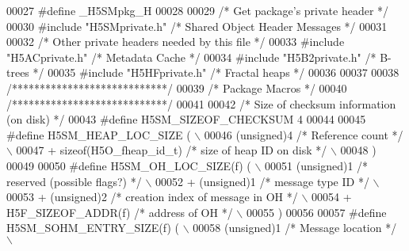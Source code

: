 \begin{DoxyCode}
00027 \textcolor{preprocessor}{#define \_H5SMpkg\_H}
00028 
00029 \textcolor{comment}{/* Get package's private header */}
00030 \textcolor{preprocessor}{#include "H5SMprivate.h"}    \textcolor{comment}{/* Shared Object Header Messages    */}
00031 
00032 \textcolor{comment}{/* Other private headers needed by this file */}
00033 \textcolor{preprocessor}{#include "H5ACprivate.h"}        \textcolor{comment}{/* Metadata Cache           */}
00034 \textcolor{preprocessor}{#include "H5B2private.h"}        \textcolor{comment}{/* B-trees                              */}
00035 \textcolor{preprocessor}{#include "H5HFprivate.h"}        \textcolor{comment}{/* Fractal heaps            */}
00036 
00037 
00038 \textcolor{comment}{/****************************/}
00039 \textcolor{comment}{/* Package Macros           */}
00040 \textcolor{comment}{/****************************/}
00041 
00042 \textcolor{comment}{/* Size of checksum information (on disk) */}
00043 \textcolor{preprocessor}{#define H5SM\_SIZEOF\_CHECKSUM 4}
00044 
00045 \textcolor{preprocessor}{#define H5SM\_HEAP\_LOC\_SIZE (                                                  \(\backslash\)}
00046 \textcolor{preprocessor}{        (unsigned)4                     }\textcolor{comment}{/* Reference count */}\textcolor{preprocessor}{                 \(\backslash\)}
00047 \textcolor{preprocessor}{        + sizeof(H5O\_fheap\_id\_t)        }\textcolor{comment}{/* size of heap ID on disk */}\textcolor{preprocessor}{         \(\backslash\)}
00048 \textcolor{preprocessor}{    )}
00049 
00050 \textcolor{preprocessor}{#define H5SM\_OH\_LOC\_SIZE(f) (                                                 \(\backslash\)}
00051 \textcolor{preprocessor}{        (unsigned)1             }\textcolor{comment}{/* reserved (possible flags?) */}\textcolor{preprocessor}{              \(\backslash\)}
00052 \textcolor{preprocessor}{        + (unsigned)1           }\textcolor{comment}{/* message type ID */}\textcolor{preprocessor}{                 \(\backslash\)}
00053 \textcolor{preprocessor}{        + (unsigned)2           }\textcolor{comment}{/* creation index of message in OH */}\textcolor{preprocessor}{         \(\backslash\)}
00054 \textcolor{preprocessor}{        + H5F\_SIZEOF\_ADDR(f)    }\textcolor{comment}{/* address of OH */}\textcolor{preprocessor}{                           \(\backslash\)}
00055 \textcolor{preprocessor}{    )}
00056 
00057 \textcolor{preprocessor}{#define H5SM\_SOHM\_ENTRY\_SIZE(f) (                                             \(\backslash\)}
00058 \textcolor{preprocessor}{        (unsigned)1             }\textcolor{comment}{/* Message location */}\textcolor{preprocessor}{                        \(\backslash\)}

\end{DoxyCode}
